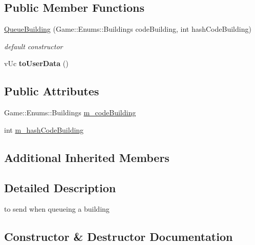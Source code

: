\subsection*{Public Member Functions}
\begin{DoxyCompactItemize}
\item 
\hyperlink{class_network_1_1_messages_1_1_queue_building_a7f099c69489640a56f244eab67a5160a}{Queue\+Building} (Game\+::\+Enums\+::\+Buildings code\+Building, int hash\+Code\+Building)
\begin{DoxyCompactList}\small\item\em default constructor \end{DoxyCompactList}\item 
\mbox{\label{class_network_1_1_messages_1_1_queue_building_adff8ff7d5aa05632ecfc894a094adf9f}} 
v\+Uc {\bfseries to\+User\+Data} ()
\end{DoxyCompactItemize}
\subsection*{Public Attributes}
\begin{DoxyCompactItemize}
\item 
Game\+::\+Enums\+::\+Buildings \hyperlink{class_network_1_1_messages_1_1_queue_building_acc247e4498d55683db7c077dca974892}{m\+\_\+code\+Building}
\item 
int \hyperlink{class_network_1_1_messages_1_1_queue_building_af074af232700b5cfd1519f9b89b04a53}{m\+\_\+hash\+Code\+Building}
\end{DoxyCompactItemize}
\subsection*{Additional Inherited Members}


\subsection{Detailed Description}
to send when queueing a building 

\subsection{Constructor \& Destructor Documentation}
\mbox{\label{class_network_1_1_messages_1_1_queue_building_a7f099c69489640a56f244eab67a5160a}} 
